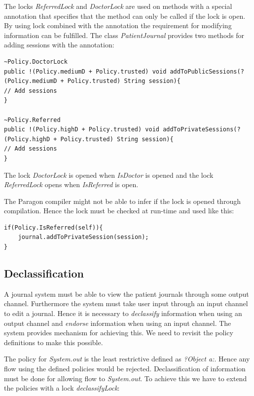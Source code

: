 The locks \emph{ReferredLock} and \emph{DoctorLock} are used on methods with a special annotation that specifies that the method can only be called if the lock is open. By using lock combined with the annotation the requirement for modifying information can be fulfilled. The class \emph{PatientJournal} provides two methods for adding sessions with the annotation:

\begin{lstlisting}
~Policy.DoctorLock
public !(Policy.mediumD + Policy.trusted) void addToPublicSessions(?(Policy.mediumD + Policy.trusted) String session){
// Add sessions
} 

~Policy.Referred
public !(Policy.highD + Policy.trusted) void addToPrivateSessions(?(Policy.highD + Policy.trusted) String session){
// Add sessions
} 	
\end{lstlisting}  

The lock \emph{DoctorLock} is opened when \emph{IsDoctor} is opened and the lock \emph{ReferredLock} opens when \emph{IsReferred} is open. 

The Paragon compiler might not be able to infer if the lock is opened through compilation. Hence the lock must be checked at run-time and used like this:

\begin{lstlisting}
if(Policy.IsReferred(self)){
	journal.addToPrivateSession(session);
}
\end{lstlisting}



\subsection{Declassification}
A journal system must be able to view the patient journals through some output channel. Furthermore the system must take user input through an input channel to edit a journal. Hence it is necessary to \emph{declassify} information when using an output channel and \emph{endorse} information when using an input channel. The system provides mechanism for achieving this. We need to revisit the policy definitions to make this possible. 

The policy for \emph{System.out} is the least restrictive defined as \emph{?{Object a:}}.
Hence any flow using the defined policies would be rejected. Declassification of information must be done for allowing flow to \emph{System.out}. To achieve this we have to extend the policies with a lock \emph{declassifyLock}:


